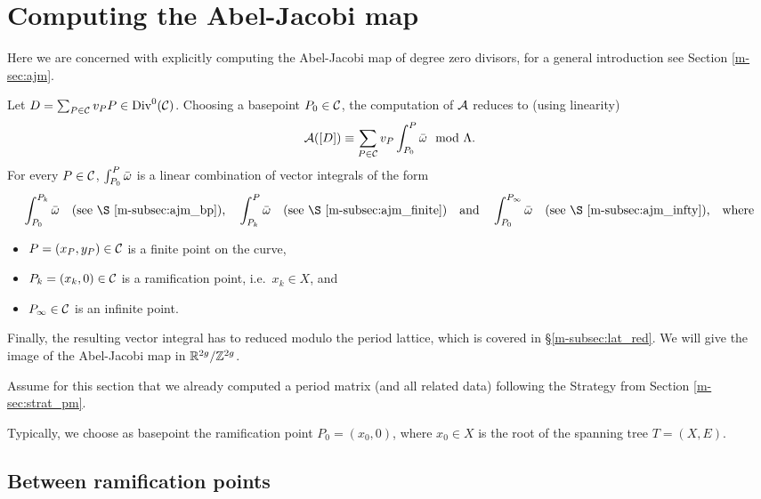 \documentclass[main.tex]{subfiles}
\begin{document}
  \section{Computing the Abel-Jacobi map}\label{sec:comp_ajm}
  
   Here we are concerned with explicitly computing the Abel-Jacobi map of degree zero divisors, for a general introduction see Section \ref{m-sec:ajm}.
   
   Let $D = \sum_{P \in \mathcal{C}} v_P P \in \operatorname{Div}^0(\mathcal{C})$. Choosing a basepoint $P_0 \in \mathcal{C}$, the computation of $\mathcal{A}$ reduces to (using linearity)
   \begin{equation}
     \mathcal{A}([D]) \equiv \sum_{P \in \mathcal{C}} v_P \int_{P_0}^P \bar{\omega} \mod \Lambda.
   \end{equation}
  For every $P \in \mathcal{C}$, $\int_{P_0}^P \bar{\omega}$ is a linear combination of vector integrals of the form
  \begin{align*}
    \int_{P_0}^{P_k} \bar\w\quad \text{(see \S \ref{m-subsec:ajm_bp}),} \quad
    \int_{P_k}^{P} \bar\w \quad \text{(see \S \ref{m-subsec:ajm_finite})}
    \quad \text{and} \quad \int_{P_0}^{P_{\infty}} \bar\w\quad \text{(see \S \ref{m-subsec:ajm_infty}),} \quad \text{where}
  \end{align*}
  \begin{itemize}
   \item $P = (x_P,y_P) \in \mathcal{C}$ is a finite point on the curve,
   \item $P_k = (x_k,0) \in \mathcal{C}$ is a ramification point, i.e.\ $x_k \in X$, and
   \item $P_{\infty} \in \mathcal{C}$ is an infinite point.
  \end{itemize}
  Finally, the resulting vector integral has to reduced modulo the period lattice, which is covered in \S \ref{m-subsec:lat_red}. We will give the 
  image of the Abel-Jacobi map in $\mathbb{R}^{2g} / \mathbb{Z}^{2g}$.
  
  Assume for this section that we already computed a period matrix (and all related data) following the Strategy from Section \ref{m-sec:strat_pm}. 
  
  Typically, we choose as basepoint the ramification point $P_0 = (x_0,0)$, where $x_0 \in X$ is the root of the spanning tree $T = (X,E)$.

  
   
  \subsection{Between ramification points}\label{subsec:ajm_bp}
\end{document}
